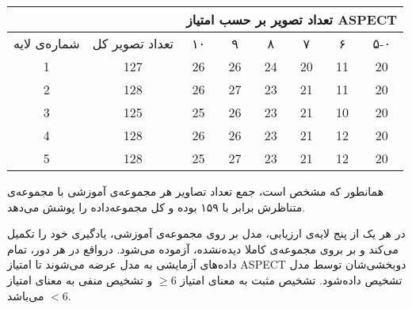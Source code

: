 \begin{tabular}{cccccccc}
    \cline{3-8}
                                                               &                                        & \multicolumn{6}{c}{تعداد تصویر بر حسب امتیاز ASPECT}                                                                                                                                                                             \\ \hline
     
    {شماره‌ی لایه} & تعداد تصویر کل & {۱۰} & {۹} & {۸} & {۷} & {۶} & ۵-۰ \\ \hline
    {1}                                    & 127                                    & {26}                         & {26}                        & {24}                        & {20}                        & {11}                        & 20  \\
    {2}                                    & 128                                    & {26}                         & {27}                        & {23}                        & {21}                        & {11}                        & 20  \\ 
    {3}                                    & 125                                    & {25}                         & {26}                        & {23}                        & {21}                        & {10}                        & 20  \\ 
    {4}                                    & 128                                    & {26}                         & {26}                        & {23}                        & {21}                        & {12}                        & 20  \\ 
    {5}                                    & 128                                    & {25}                         & {27}                        & {23}                        & {21}                        & {12}                        & 20  \\ \hline
    \end{tabular}


همانطور که مشخص است، جمع تعداد تصاویر هر مجموعه‌ی آموزشی با مجموعه‌ی متناظرش برابر با ۱۵۹ بوده و کل مجموعه‌داده را پوشش می‌دهد.

در هر یک از پنج لایه‌ی ارزیابی، مدل بر روی مجموعه‌ی آموزشی، یادگیری خود را تکمیل می‌کند و بر بروی
 مجموعه‌ی کاملا دیده‌نشده، آزموده می‌شود.
 درواقع در هر دور، تمام داده‌های آزمایشی به مدل عرضه می‌شوند تا امتیاز ASPECT دو‌بخشی‌شان توسط مدل تشخیص داده‌شود.
تشخیص مثبت به معنای امتیاز $\geq 6$ و تشخیص منفی به معنای امتیاز $<6$ می‌باشد.

